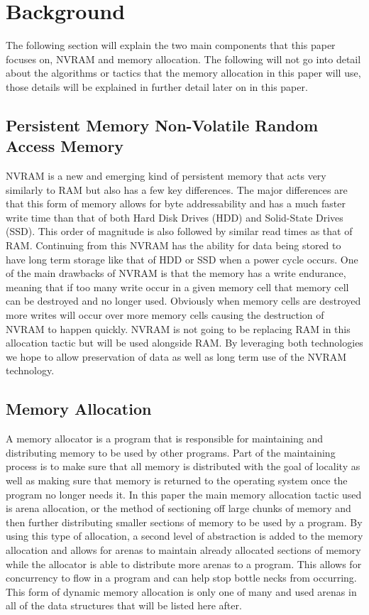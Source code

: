 \documentclass[conference]{IEEEtran}
\begin{document}
\section{Background}
The following section will explain the two main components that this paper focuses on, NVRAM and memory allocation. The following will not go into detail about the algorithms or tactics that the memory allocation in this paper will use, those details will be explained in further detail later on in this paper. 
\subsection{Persistent Memory Non-Volatile Random Access Memory}
NVRAM is a new and emerging kind of persistent memory that acts very similarly to RAM but also has a few key differences. The major differences are that this form of memory allows for byte addressability and has a much faster write time than that of both Hard Disk Drives (HDD) and Solid-State Drives (SSD). This order of magnitude is also followed by similar read times as that of RAM. Continuing from this NVRAM has the ability for data being stored to have long term storage like that of HDD or SSD when a power cycle occurs. One of the main drawbacks of NVRAM is that the memory has a write endurance, meaning that if too many write occur in a given memory cell that memory cell can be destroyed and no longer used. Obviously when memory cells are destroyed more writes will occur over more memory cells causing the destruction of NVRAM to happen quickly. NVRAM is not going to be replacing RAM in this allocation tactic but will be used alongside RAM. By leveraging both technologies we hope to allow preservation of data as well as long term use of the NVRAM technology.
\subsection{Memory Allocation}
    A memory allocator is a program that is responsible for maintaining and distributing memory to be used by other programs. Part of the maintaining process is to make sure that all memory is distributed with the goal of locality as well as making sure that memory is returned to the operating system once the program no longer needs it. In this paper the main memory allocation tactic used is arena allocation, or the method of sectioning off large chunks of memory and then further distributing smaller sections of memory to be used by a program. By using this type of allocation, a second level of abstraction is added to the memory allocation and allows for arenas to maintain already allocated sections of memory while the allocator is able to distribute more arenas to a program. This allows for concurrency to flow in a program and can help stop bottle necks from occurring. This form of dynamic memory allocation is only one of many and used arenas in all of the data structures \cite{Chatzistergiou} that will be listed here after. 
\end{document}
